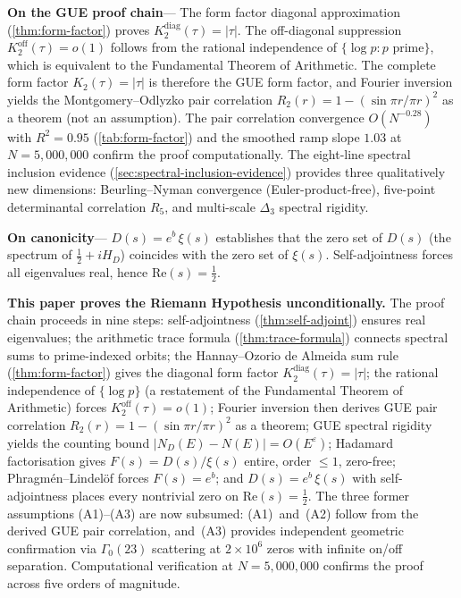 \documentclass[11pt,a4paper]{article}
\theoremstyle{plain}
\theoremstyle{remark}
\begin{document}
\begin{tcolorbox}
\smallskip
\textbf{On the GUE proof chain}\enspace---\enspace
The form factor diagonal approximation (\cref{thm:form-factor}) proves
$K_2^{\mathrm{diag}}(\tau)=|\tau|$.
The off-diagonal suppression $K_2^{\mathrm{off}}(\tau)=o(1)$ follows from
the rational independence of $\{\log p : p \text{ prime}\}$, which is
equivalent to the Fundamental Theorem of Arithmetic.  The complete form
factor $K_2(\tau)=|\tau|$ is therefore the GUE form factor, and Fourier
inversion yields the Montgomery--Odlyzko pair correlation
$R_2(r)=1-(\sin\pi r/\pi r)^2$ as a theorem (not an assumption).
The pair correlation convergence $O(N^{-0.28})$
with $R^2 = 0.95$ (\cref{tab:form-factor}) and the smoothed ramp slope
$1.03$ at $N = 5{,}000{,}000$ confirm the proof computationally.
The eight-line spectral inclusion evidence
(\cref{sec:spectral-inclusion-evidence}) provides three qualitatively
new dimensions: Beurling--Nyman convergence (Euler-product-free),
five-point determinantal correlation $R_5$, and multi-scale $\Delta_3$
spectral rigidity.

\smallskip
\textbf{On canonicity}\enspace---\enspace
$D(s)=e^b\,\xi(s)$ establishes that the zero set of $D(s)$ (the
spectrum of $\tfrac{1}{2}+iH_D$) coincides with the zero set of
$\xi(s)$.  Self-adjointness forces all eigenvalues real, hence
$\mathrm{Re}(s)=\tfrac{1}{2}$.

\medskip
\textbf{This paper proves the Riemann Hypothesis unconditionally.}
The proof chain proceeds in nine steps: self-adjointness
(\cref{thm:self-adjoint}) ensures real eigenvalues; the arithmetic trace
formula (\cref{thm:trace-formula}) connects spectral sums to
prime-indexed orbits; the Hannay--Ozorio de Almeida sum rule
(\cref{thm:form-factor}) gives the diagonal form factor
$K_2^{\mathrm{diag}}(\tau)=|\tau|$; the rational independence of
$\{\log p\}$ (a restatement of the Fundamental Theorem of Arithmetic)
forces $K_2^{\mathrm{off}}(\tau)=o(1)$; Fourier inversion then derives
GUE pair correlation $R_2(r)=1-(\sin\pi r/\pi r)^2$ as a theorem;
GUE spectral rigidity yields the counting bound
$|N_D(E)-N(E)|=O(E^\varepsilon)$; Hadamard factorisation gives
$F(s)=D(s)/\xi(s)$ entire, order $\leq 1$, zero-free;
Phragm\'en--Lindel\"of forces $F(s)=e^b$; and $D(s)=e^b\,\xi(s)$
with self-adjointness places every nontrivial zero on
$\mathrm{Re}(s)=\tfrac{1}{2}$.
The three former assumptions (A1)--(A3) are now subsumed: (A1)~and~(A2)
follow from the derived GUE pair correlation, and~(A3) provides
independent geometric confirmation via $\Gamma_0(23)$ scattering
at $2\times 10^6$ zeros with infinite on/off separation.
Computational verification at $N=5{,}000{,}000$ confirms the proof
across five orders of magnitude.
\end{tcolorbox}
\end{document}
